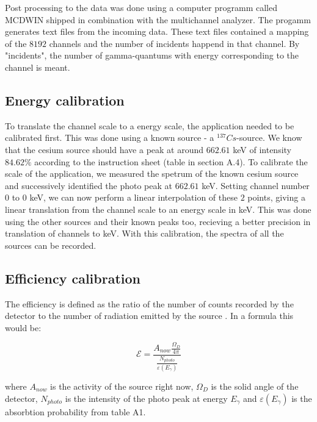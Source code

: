 \documentclass[a4paper]{article}
\begin{document}
Post processing to the data was done using a computer programm called MCDWIN \cite{mcdwin:2018} shipped in combination with the multichannel analyzer. The progamm generates text files from the incoming data. These text files contained a mapping of the $8192$ channels and the number of incidents happend in that channel. By "incidents", the number of gamma-quantums with energy corresponding to the channel is meant.

\subsection{Energy calibration}

To translate the channel scale to a energy scale, the application needed to be calibrated first. This was done using a known source - a $^{137}Cs$-source. We know that the cesium source should have a peak at around $662.61$ keV of intensity $84.62 \%$ according to the instruction sheet \cite{instruction_sheet} (table in section A.4). To calibrate the scale of the application, we measured the spetrum of the known cesium source and successively identified the photo peak at $662.61$ keV. Setting channel number $0$ to $0$ keV, we can now perform a linear interpolation of these $2$ points, giving a linear translation from the channel scale to an energy scale in keV. This was done using the other sources and their known peaks too, recieving a better precision in translation of channels to keV. With this calibration, the spectra of all the sources can be recorded.

\subsection{Efficiency calibration}

The efficiency is defined as the ratio of the number of counts recorded by the detector to the number of radiation emitted by the source \cite{akkurt2014}. In a formula this would be:

\begin{equation}
\mathcal{E} = \frac{A_{now} \frac{\Omega_D}{4 \pi} }{ \frac{N_{photo}}{ \varepsilon(E_{\gamma}) } }
\label{eq:eff}
\end{equation}

where $A_{now}$ is the activity of the source right now, $\Omega_D$ is the solid angle of the detector, $N_{photo}$ is the intensity of the photo peak at energy $E_{\gamma}$ and $\varepsilon(E_{\gamma})$ is the absorbtion probability from \cite{instruction_sheet} table A1.
\end{document}
